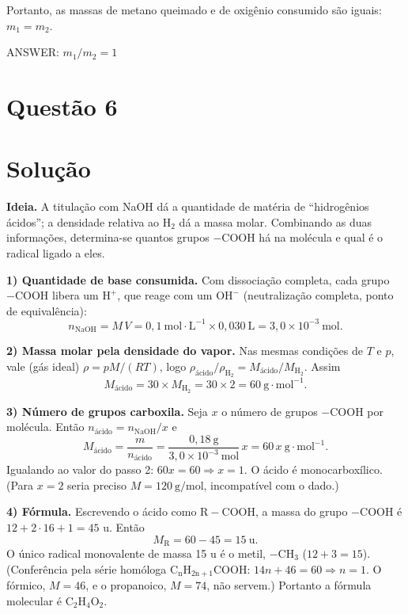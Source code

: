 \documentclass{article}%
\begin{document}
Portanto, as massas de metano queimado e de oxigênio consumido são iguais: $m_1 = m_2$.

ANSWER: $m_1/m_2 = 1$%
\newpage%
\section*{Questão 6}

\section*{Solução}

\textbf{Ideia.} A titulação com NaOH dá a quantidade de matéria de ``hidrogênios ácidos''; a densidade relativa ao $\mathrm{H_2}$ dá a massa molar. Combinando as duas informações, determina-se quantos grupos $-\mathrm{COOH}$ há na molécula e qual é o radical ligado a eles.

\textbf{1) Quantidade de base consumida.} Com dissociação completa, cada grupo $-\mathrm{COOH}$ libera um $\mathrm{H^+}$, que reage com um $\mathrm{OH^-}$ (neutralização completa, ponto de equivalência):
\[
n_{\mathrm{NaOH}} = M\,V = 0{,}1\ \mathrm{mol\cdot L^{-1}}\times 0{,}030\ \mathrm{L} = 3{,}0\times10^{-3}\ \mathrm{mol}.
\]

\textbf{2) Massa molar pela densidade do vapor.} Nas mesmas condições de $T$ e $p$, vale (gás ideal) $\rho = pM/(RT)$, logo $\rho_{\text{ácido}}/\rho_{\mathrm{H_2}} = M_{\text{ácido}}/M_{\mathrm{H_2}}$. Assim
\[
M_{\text{ácido}} = 30\times M_{\mathrm{H_2}} = 30\times 2 = 60\ \mathrm{g\cdot mol^{-1}}.
\]

\textbf{3) Número de grupos carboxila.} Seja $x$ o número de grupos $-\mathrm{COOH}$ por molécula. Então $n_{\text{ácido}} = n_{\mathrm{NaOH}}/x$ e
\[
M_{\text{ácido}} = \frac{m}{n_{\text{ácido}}} = \frac{0{,}18\ \mathrm{g}}{3{,}0\times10^{-3}\ \mathrm{mol}}\,x = 60\,x\ \mathrm{g\cdot mol^{-1}}.
\]
Igualando ao valor do passo 2: $60x = 60 \Rightarrow x = 1$. O ácido é monocarboxílico. (Para $x=2$ seria preciso $M=120\ \mathrm{g/mol}$, incompatível com o dado.)

\textbf{4) Fórmula.} Escrevendo o ácido como $\mathrm{R{-}COOH}$, a massa do grupo $-\mathrm{COOH}$ é $12+2\cdot16+1=45$ u. Então
\[
M_{\mathrm{R}} = 60-45 = 15\ \mathrm{u}.
\]
O único radical monovalente de massa 15 u é o metil, $-\mathrm{CH_3}$ ($12+3=15$). (Conferência pela série homóloga $\mathrm{C_nH_{2n+1}COOH}$: $14n+46=60\Rightarrow n=1$. O fórmico, $M=46$, e o propanoico, $M=74$, não servem.) Portanto a fórmula molecular é $\mathrm{C_2H_4O_2}$.
\end{document}
